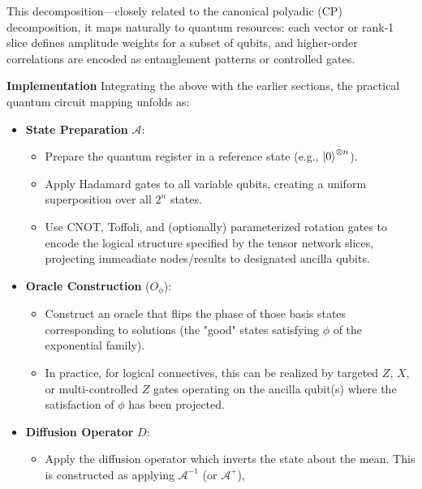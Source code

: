 \documentclass[encoding=utf8,british]{tumphthesis}
\begin{document}
            This decomposition—closely related to the canonical polyadic (CP) decomposition, it maps naturally to quantum resources: 
            each vector or rank-1 slice defines amplitude weights for a subset of qubits, and higher-order correlations are encoded as 
            entanglement patterns or controlled gates.

        \textbf{Implementation}
            Integrating the above with the earlier sections, the practical quantum circuit mapping unfolds as:
            \begin{itemize}
                \item \textbf{State Preparation} $\mathcal{A}$: 
                    \begin{itemize}
                        \item Prepare the quantum register in a reference state (e.g., $\left|0\right>^{\otimes n}$).
                        \item Apply Hadamard gates to all variable qubits, creating a uniform superposition over all $2^n$ states.
                        \item Use CNOT, Toffoli, and (optionally) parameterized rotation gates to encode the logical structure specified 
                        by the tensor network slices, projecting immeadiate nodes/results to designated ancilla qubits.
                    \end{itemize}
                \item \textbf{Oracle Construction} ($O_\phi$):
                    \begin{itemize}
                        \item Construct an oracle that flips the phase of those basis states corresponding to solutions (the "good" states satisfying $\phi$ of the exponential family). 
                        \item In practice, for logical connectives, this can be realized by targeted $Z$, $X$, or multi-controlled $Z$ gates operating on the 
                        ancilla qubit(s) where the satisfaction of $\phi$ has been projected.
                    \end{itemize}
                \item \textbf{Diffusion Operator} $D$:
                    \begin{itemize}
                        \item Apply the diffusion operator which inverts the state about the mean. This is constructed as applying $\mathcal{A}^{-1}$ (or $\mathcal{A}^+$), 

\end{itemize}
\end{itemize}
\end{document}

